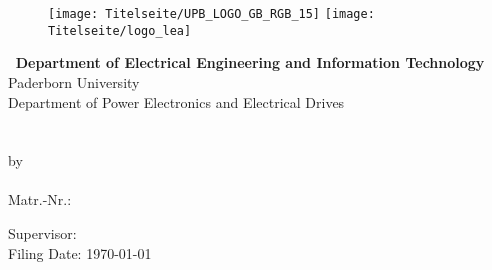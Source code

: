 \begin{titlepage}
\begin{center}
  \begin{figure}\vspace{-1cm}
      \texttt{[image: Titelseite/UPB\_LOGO\_GB\_RGB\_15]} \hspace{4cm}
      \texttt{[image: Titelseite/logo\_lea]}
  \end{figure}
$\:$ \newline
{\bf Department of Electrical Engineering and Information Technology}\\
Paderborn University\\
Department of Power Electronics and Electrical Drives\\
\Mybetreuera\\
\vfill
$\:$ \newline
\Large{\bf{\textsf{\Mytyp \vspace{1cm} \\ \Mytitel}}}
\vfill
\large{by\\}
\vfill
\Large{\large \Myautor\\ Matr.-Nr.: \Mymatrikelnr}
\vfill
\begin{flushleft}
\large{Supervisor: \Mybetreuerb\\}
\large{Filing Date: \today \\}
\end{flushleft}
\renewcommand{\baselinestretch}{1}\normalsize
\end{center}
\end{titlepage}
